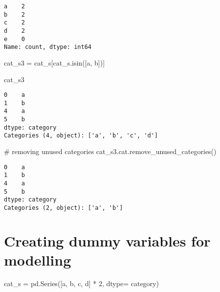 \documentclass[
  letterpaper,
  DIV=11,
  numbers=noendperiod]{scrreprt}
\newenvironment{Shaded}{\begin{snugshade}}{\end{snugshade}}
\newcommand{\CommentTok}[1]{\textcolor[rgb]{0.37,0.37,0.37}{#1}}
\newcommand{\DecValTok}[1]{\textcolor[rgb]{0.68,0.00,0.00}{#1}}
\newcommand{\NormalTok}[1]{\textcolor[rgb]{0.00,0.23,0.31}{#1}}
\newcommand{\OperatorTok}[1]{\textcolor[rgb]{0.37,0.37,0.37}{#1}}
\newcommand{\StringTok}[1]{\textcolor[rgb]{0.13,0.47,0.30}{#1}}
\begin{document}
\begin{verbatim}
a    2
b    2
c    2
d    2
e    0
Name: count, dtype: int64
\end{verbatim}

\begin{Shaded}
\begin{Highlighting}[]
\NormalTok{cat\_s3 }\OperatorTok{=}\NormalTok{ cat\_s[cat\_s.isin([}\StringTok{\textquotesingle{}a\textquotesingle{}}\NormalTok{, }\StringTok{\textquotesingle{}b\textquotesingle{}}\NormalTok{])]}

\NormalTok{cat\_s3}
\end{Highlighting}
\end{Shaded}

\begin{verbatim}
0    a
1    b
4    a
5    b
dtype: category
Categories (4, object): ['a', 'b', 'c', 'd']
\end{verbatim}

\begin{Shaded}
\begin{Highlighting}[]
\CommentTok{\# removing unused categories}
\NormalTok{cat\_s3.cat.remove\_unused\_categories()}
\end{Highlighting}
\end{Shaded}

\begin{verbatim}
0    a
1    b
4    a
5    b
dtype: category
Categories (2, object): ['a', 'b']
\end{verbatim}

\hypertarget{creating-dummy-variables-for-modelling}{%
\section{Creating dummy variables for
modelling}\label{creating-dummy-variables-for-modelling}}

\begin{Shaded}
\begin{Highlighting}[]
\NormalTok{cat\_s }\OperatorTok{=}\NormalTok{ pd.Series([}\StringTok{\textquotesingle{}a\textquotesingle{}}\NormalTok{, }\StringTok{\textquotesingle{}b\textquotesingle{}}\NormalTok{, }\StringTok{\textquotesingle{}c\textquotesingle{}}\NormalTok{, }\StringTok{\textquotesingle{}d\textquotesingle{}}\NormalTok{] }\OperatorTok{*} \DecValTok{2}\NormalTok{,}
\NormalTok{                 dtype}\OperatorTok{=} \StringTok{\textquotesingle{}category\textquotesingle{}}\NormalTok{)}
\end{Highlighting}
\end{Shaded}
\end{document}
